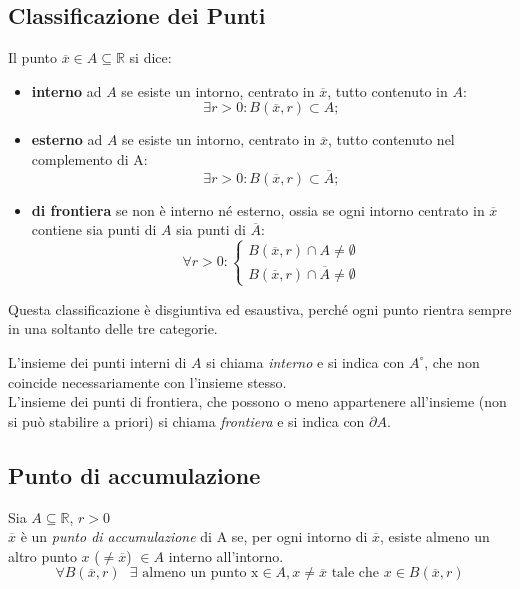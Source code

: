 \documentclass[a4paper,12pt, oneside]{book}
\begin{document}
\subsection{Classificazione dei Punti} Il punto $\overline{x}\in A \subseteq
\mathbb{R}$ si dice:
\begin{itemize}
  \item \textbf{interno} ad $A$ se esiste un intorno, centrato in
  $\overline{x}$, tutto contenuto in $A$: $$\exists r>0\colon
  B(\overline{x},r)\subset A;$$
  \item \textbf{esterno} ad $A$ se esiste un intorno, centrato in
  $\overline{x}$, tutto contenuto nel complemento di A: $$\exists r>0\colon
  B(\overline{x},r)\subset\overline{A};$$
  \item \textbf{di frontiera} se non è interno né esterno, ossia se ogni intorno
  centrato in $\overline{x}$ contiene sia punti di $A$ sia punti di
  $\overline{A}$:
  $$\forall r>0:\left\{
    \begin{array}{ll} B(\overline{x},r)\cap A\neq\emptyset \\
      B(\overline{x},r)\cap\overline{A}\neq\emptyset
    \end{array} \right.$$
\end{itemize}
\begin{osservazione} Questa classificazione è disgiuntiva ed esaustiva, perché
  ogni punto rientra sempre in una soltanto delle tre categorie.
\end{osservazione}
\begin{shaded} L'insieme dei punti interni di $A$ si chiama \emph{interno} e si
  indica con ${A}^{\circ}$, che non coincide necessariamente con l'insieme
  stesso.\\

  L'insieme dei punti di frontiera, che possono o meno appartenere all'insieme
  (non si può stabilire a priori) si chiama \emph{frontiera} e si indica con
  $\partial A$.
\end{shaded}
\subsection{Punto di accumulazione}
\begin{definizione} Sia $A \subseteq \mathbb{R}$, $r>0$\\ $\overline{x}$ è un
  \emph{punto di accumulazione} di A se, per ogni intorno di $\overline{x}$,
  esiste almeno un altro punto $x$ ($ \neq \overline{x}$) $\in A$ interno
  all'intorno.
  \begin{equation} \forall B(\overline{x},r) \mbox{ } \exists \mbox{ almeno un
      punto x} \in A, x \neq \overline{x} \mbox{ tale che } x \in B(\overline{x},r)
  \end{equation}
\end{definizione}
\end{document}
